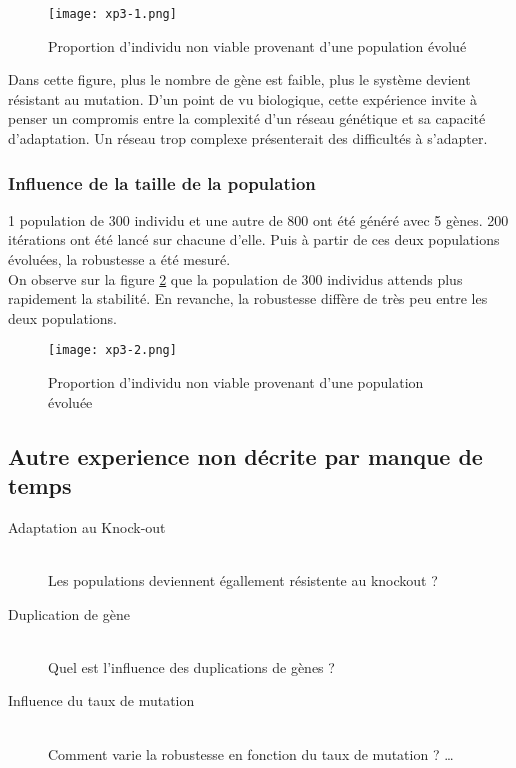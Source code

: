 \documentclass{article}
\begin{document}
	\begin{figure}[h]
	\centering
	\caption[test]{Proportion d'individu non viable provenant d'une population évolué }
	\texttt{[image: xp3-1.png]}
	\label{xp3.1}
	\end{figure}


	Dans cette figure, plus le nombre de gène est faible, plus le système devient résistant au mutation. D'un point de vu biologique, cette expérience invite à penser un compromis entre la complexité d'un réseau génétique et sa capacité d'adaptation. Un réseau trop complexe présenterait des difficultés à s'adapter.  \\


	\subsubsection{Influence de la taille de la population}
	1 population de 300 individu et une autre de 800 ont été généré avec 5 gènes. 200 itérations ont été lancé sur chacune d'elle. Puis à partir de ces deux populations évoluées, la robustesse a été mesuré. \\
	On observe sur la figure \ref{xp3.2} que la population de 300 individus attends plus rapidement la stabilité. En revanche, la robustesse diffère de très peu entre les deux populations. 


	\begin{figure}[h]
	\centering
	\caption[test]{Proportion d'individu non viable provenant d'une population évoluée }
	\texttt{[image: xp3-2.png]}
	\label{xp3.2}
	\end{figure}

	\subsection{Autre experience non décrite par manque de temps}
	\begin{description}
	  \item[Adaptation au Knock-out] \hfill \\
	  Les populations deviennent égallement résistente au knockout ?
	  \item[Duplication de gène] \hfill \\
	  Quel est l'influence des duplications de gènes  ? 
	  \item[Influence du taux de mutation] \hfill \\
	  Comment varie la robustesse en fonction du taux de mutation ? \ldots
	\end{description}
\end{document}
